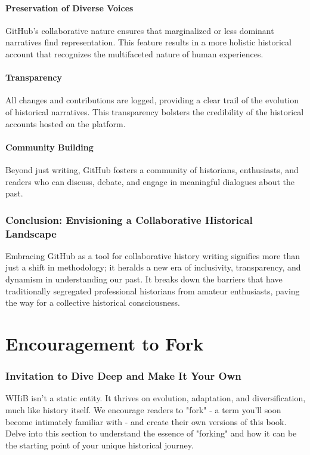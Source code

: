 \documentclass[a4paper,12pt]{book}
\begin{document}
\subsubsection*{Preservation of Diverse Voices}
GitHub's collaborative nature ensures that marginalized or less dominant narratives find representation. This feature results in a more holistic historical account that recognizes the multifaceted nature of human experiences.

\subsubsection*{Transparency}
All changes and contributions are logged, providing a clear trail of the evolution of historical narratives. This transparency bolsters the credibility of the historical accounts hosted on the platform.

\subsubsection*{Community Building}
Beyond just writing, GitHub fosters a community of historians, enthusiasts, and readers who can discuss, debate, and engage in meaningful dialogues about the past.

\subsection*{Conclusion: Envisioning a Collaborative Historical Landscape}
Embracing GitHub as a tool for collaborative history writing signifies more than just a shift in methodology; it heralds a new era of inclusivity, transparency, and dynamism in understanding our past. It breaks down the barriers that have traditionally segregated professional historians from amateur enthusiasts, paving the way for a collective historical consciousness. 

\chapter{Encouragement to Fork}
\subsection*{Invitation to Dive Deep and Make It Your Own}
WHiB isn't a static entity. It thrives on evolution, adaptation, and diversification, much like history itself. We encourage readers to "fork" - a term you'll soon become intimately familiar with - and create their own versions of this book. Delve into this section to understand the essence of "forking" and how it can be the starting point of your unique historical journey.
\end{document}
